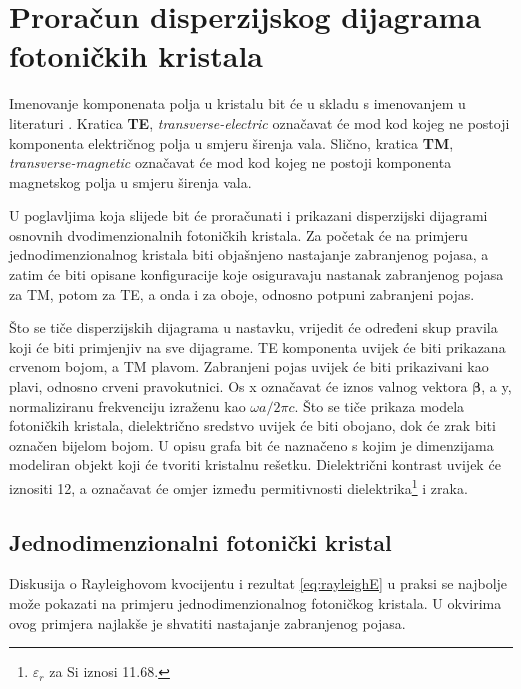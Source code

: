 \documentclass[utf8, seminar, numeric]{fer}
\begin{document}
\chapter{Proračun disperzijskog dijagrama fotoničkih kristala}

Imenovanje komponenata polja u kristalu bit će u skladu s imenovanjem u
literaturi \cite{joannopoulos2011photonic}. Kratica \textbf{TE},
\textit{transverse-electric} označavat će mod kod kojeg ne postoji komponenta
električnog polja u smjeru širenja vala. Slično, kratica \textbf{TM},
\textit{transverse-magnetic} označavat će mod kod kojeg ne postoji komponenta
magnetskog polja u smjeru širenja vala.

U poglavljima koja slijede bit će proračunati i prikazani disperzijski dijagrami
osnovnih dvodimenzionalnih fotoničkih kristala. Za početak će na primjeru
jednodimenzionalnog kristala biti objašnjeno nastajanje zabranjenog pojasa, a
zatim će biti opisane konfiguracije koje osiguravaju nastanak zabranjenog pojasa
za TM, potom za TE, a onda i za oboje, odnosno potpuni zabranjeni pojas.

Što se tiče disperzijskih dijagrama u nastavku, vrijedit će određeni skup pravila
koji će biti primjenjiv na sve dijagrame. TE komponenta uvijek će biti prikazana
crvenom bojom, a TM plavom. Zabranjeni pojas uvijek će biti prikazivani kao
plavi, odnosno crveni pravokutnici. Os x označavat će iznos valnog vektora
${\bm{\beta}}$, a y, normaliziranu frekvenciju izraženu kao
${\omega a/ 2 \pi c}$. Što se tiče prikaza modela fotoničkih kristala,
dielektrično sredstvo uvijek će biti obojano, dok će zrak biti označen bijelom
bojom. U opisu grafa bit će naznačeno s kojim je dimenzijama modeliran objekt
koji će tvoriti kristalnu rešetku. Dielektrični kontrast uvijek će iznositi 12,
a označavat će omjer između permitivnosti dielektrika\footnote{
$\varepsilon_r$ za Si iznosi 11.68.} i zraka.


\section{Jednodimenzionalni fotonički kristal}

Diskusija o Rayleighovom kvocijentu i rezultat \ref{eq:rayleighE} u praksi se
najbolje može pokazati na primjeru jednodimenzionalnog fotoničkog kristala.
U okvirima ovog primjera najlakše je shvatiti nastajanje zabranjenog pojasa.
\end{document}
